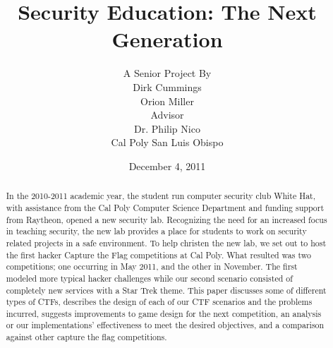 \documentclass[10pt]{article}
\begin{document}
\title{\vfill Security Education: The Next Generation}
\author{
 A Senior Project By \vspace{10pt} \\
 Dirk Cummings \\
 Orion Miller \vspace{10pt} \\
 Advisor \vspace{10pt} \\
 Dr. Philip Nico \\
 Cal Poly San Luis Obispo \vspace{10pt} \\ 
}
\date{December 4, 2011}

\maketitle

\vfill
\begin{abstract}
In the 2010-2011 academic year, the student run computer security club White
Hat, with assistance from the Cal Poly Computer Science Department and funding
support from Raytheon, opened a new security lab. Recognizing the need for an
increased focus in teaching security, the new lab provides a place for students
to work on security related projects in a safe environment. To help christen the
new lab, we set out to host the first hacker Capture the Flag competitions at
Cal Poly. What resulted was two competitions; one occurring in May 2011, and the
other in November. The first modeled more typical hacker challenges while our
second scenario consisted of completely new services with a Star Trek theme.
This paper discusses some of different types of CTFs, describes the design of
each of our CTF scenarios and the problems incurred, suggests improvements to
game design for the next competition, an analysis or our implementations'
effectiveness to meet the desired objectives, and a comparison against other
capture the flag competitions.
\end{abstract}

\thispagestyle{empty} %

\newpage

\thispagestyle{empty}  %
\tableofcontents

\newpage
\setcounter{page}{1}
\end{document}

